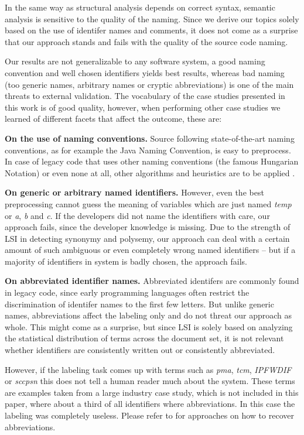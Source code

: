 \documentclass[10pt]{book}
\begin{document}
In the same way as structural analysis depends on correct syntax, semantic analysis is sensitive to the quality of the naming. Since we derive our topics solely based on the use of identifer names and comments, it does not come as a surprise that our approach stands and fails with the quality of the source code naming.

Our results are not generalizable to any software system, a good naming convention and well chosen identifiers yields best results, whereas bad naming (\ie too generic names, arbitrary names or cryptic abbreviations) is one of the main threats to external validation. The vocabulary of the case studies presented in this work is of good quality, however, when performing other case studies we learned of different facets that affect the outcome, these are:

\textbf{On the use of naming conventions.} Source following state-of-the-art naming conventions, as for example the Java Naming Convention, is easy to preprocess. In case of legacy code that uses other naming conventions (\eg the famous Hungarian Notation) or even none at all, other algorithms and heuristics are to be applied \cite{Capr93a,Anqu98b}.

\textbf{On generic or arbitrary named identifiers.} However, even the best preprocessing cannot guess the meaning of variables which are just named \emph{temp} or \emph{a}, \emph{b} and \emph{c}. If the developers did not name the identifiers with care, our approach fails, since the developer knowledge is missing. Due to the strength of LSI in detecting synonymy and polysemy, our approach can deal with a certain amount of such ambiguous or even completely wrong named identifiers -- but if a majority of identifiers in system is badly chosen, the approach fails.

\textbf{On abbreviated identifier names.} Abbreviated identifers are commonly found in legacy code, since early programming languages often restrict the discrimination of identifer names to the first few letters. But unlike generic names, abbreviations affect the labeling only and do not threat our approach  as whole. This might come as a surprise, but since LSI is solely based on analyzing the statistical distribution of terms across the document set, it is not relevant whether identifiers are consistently written out or consistently abbreviated.

However, if the labeling task comes up with terms such as \emph{pma}, \emph{tcm}, \emph{IPFWDIF} or \emph{sccpsn} this does not tell a human reader much about the system. These terms are examples taken from a large industry case study, which is not included in this paper, where about a third of all identifiers where abbreviations. In this case the labeling was completely useless. Please refer to \cite{Anqu98b} for approaches on how to recover abbreviations.
\end{document}
